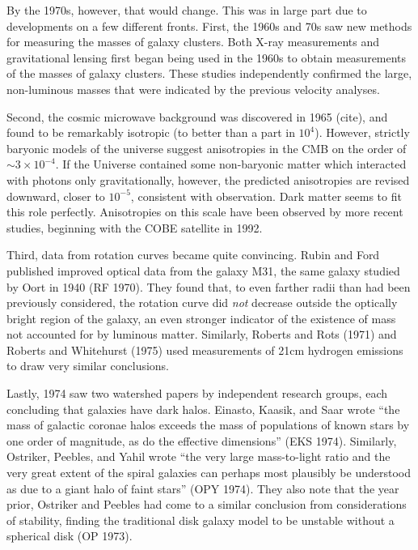 By the 1970s, however, that would change. This was in large part due to
developments on a few different fronts. First, the 1960s and 70s saw new
methods for measuring the masses of galaxy clusters. Both X-ray
measurements and gravitational lensing first began being used in the
1960s to obtain measurements of the masses of galaxy clusters. These
studies independently confirmed the large, non-luminous masses that were
indicated by the previous velocity analyses.

Second, the cosmic microwave background was discovered in 1965 (cite),
and found to be remarkably isotropic (to better than a part in
\(10^4\)). However, strictly baryonic models of the universe suggest
anisotropies in the CMB on the order of \(\sim 3 \times 10^{-4}\). If
the Universe contained some non-baryonic matter which interacted with
photons only gravitationally, however, the predicted anisotropies are
revised downward, closer to \(10^{-5}\), consistent with observation.
Dark matter seems to fit this role perfectly. Anisotropies on this scale
have been observed by more recent studies, beginning with the COBE
satellite in 1992.

Third, data from rotation curves became quite convincing. Rubin and Ford
published improved optical data from the galaxy M31, the same galaxy
studied by Oort in 1940 (RF 1970). They found that, to even farther
radii than had been previously considered, the rotation curve did
\emph{not} decrease outside the optically bright region of the galaxy,
an even stronger indicator of the existence of mass not accounted for by
luminous matter. Similarly, Roberts and Rots (1971) and Roberts and
Whitehurst (1975) used measurements of 21cm hydrogen emissions to draw
very similar conclusions.

Lastly, 1974 saw two watershed papers by independent research groups,
each concluding that galaxies have dark halos. Einasto, Kaasik, and Saar
wrote ``the mass of galactic coronae halos exceeds the mass of
populations of known stars by one order of magnitude, as do the
effective dimensions'' (EKS 1974). Similarly, Ostriker, Peebles, and
Yahil wrote ``the very large mass-to-light ratio and the very great
extent of the spiral galaxies can perhaps most plausibly be understood
as due to a giant halo of faint stars'' (OPY 1974). They also note that
the year prior, Ostriker and Peebles had come to a similar conclusion
from considerations of stability, finding the traditional disk galaxy
model to be unstable without a spherical disk (OP 1973).

